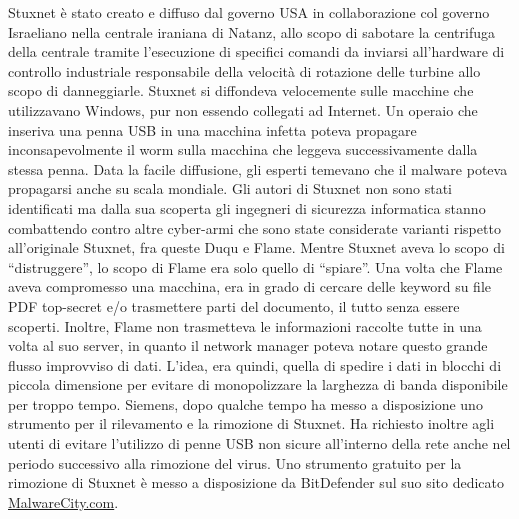 Stuxnet è stato creato e diffuso dal governo USA in collaborazione col governo Israeliano nella centrale iraniana di Natanz, allo scopo di sabotare la centrifuga della centrale tramite l'esecuzione di specifici comandi da inviarsi all'hardware di controllo industriale responsabile della velocità di rotazione delle turbine allo scopo di danneggiarle. Stuxnet si diffondeva velocemente sulle macchine che utilizzavano Windows, pur non essendo collegati ad Internet. Un operaio che inseriva una penna USB in una macchina infetta poteva propagare inconsapevolmente il worm sulla macchina che leggeva successivamente dalla stessa penna. Data la facile diffusione, gli esperti temevano che il malware poteva propagarsi anche su scala mondiale.\newline\newline
Gli autori di Stuxnet non sono stati identificati ma dalla sua scoperta gli ingegneri di sicurezza informatica stanno combattendo contro altre cyber-armi che sono state considerate varianti rispetto all'originale Stuxnet, fra queste Duqu e Flame. Mentre Stuxnet aveva lo scopo di ``distruggere'', lo scopo di Flame era solo quello di ``spiare''. Una volta che Flame aveva compromesso una macchina, era in grado di cercare delle keyword su file PDF top-secret e/o trasmettere parti del documento, il tutto senza essere scoperti.\newpage
Inoltre, Flame non trasmetteva le informazioni raccolte tutte in una volta al suo server, in quanto il network manager poteva notare questo grande flusso improvviso di dati. L'idea, era quindi, quella di spedire i dati in blocchi di piccola dimensione per evitare di monopolizzare la larghezza di banda disponibile per troppo tempo. Siemens, dopo qualche tempo ha messo a disposizione uno strumento per il rilevamento e la rimozione di Stuxnet. Ha richiesto inoltre agli utenti di evitare l'utilizzo di penne USB non sicure all'interno della rete anche nel periodo successivo alla rimozione del virus. Uno strumento gratuito per la rimozione di Stuxnet è messo a disposizione da BitDefender sul suo sito dedicato \url{MalwareCity.com}.
